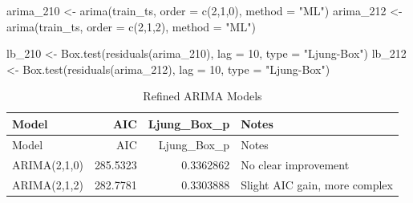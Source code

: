 \documentclass[
  11pt,
]{article}
\newenvironment{Shaded}{\begin{snugshade}}{\end{snugshade}}
\newcommand{\AttributeTok}[1]{\textcolor[rgb]{0.40,0.45,0.13}{#1}}
\newcommand{\DecValTok}[1]{\textcolor[rgb]{0.68,0.00,0.00}{#1}}
\newcommand{\FunctionTok}[1]{\textcolor[rgb]{0.28,0.35,0.67}{#1}}
\newcommand{\NormalTok}[1]{\textcolor[rgb]{0.00,0.23,0.31}{#1}}
\newcommand{\OtherTok}[1]{\textcolor[rgb]{0.00,0.23,0.31}{#1}}
\newcommand{\SpecialCharTok}[1]{\textcolor[rgb]{0.37,0.37,0.37}{#1}}
\newcommand{\StringTok}[1]{\textcolor[rgb]{0.13,0.47,0.30}{#1}}
\begin{document}
\begin{Shaded}
\begin{Highlighting}[]
\NormalTok{arima\_210 }\OtherTok{\textless{}{-}} \FunctionTok{arima}\NormalTok{(train\_ts, }\AttributeTok{order =} \FunctionTok{c}\NormalTok{(}\DecValTok{2}\NormalTok{,}\DecValTok{1}\NormalTok{,}\DecValTok{0}\NormalTok{), }\AttributeTok{method =} \StringTok{"ML"}\NormalTok{)}
\NormalTok{arima\_212 }\OtherTok{\textless{}{-}} \FunctionTok{arima}\NormalTok{(train\_ts, }\AttributeTok{order =} \FunctionTok{c}\NormalTok{(}\DecValTok{2}\NormalTok{,}\DecValTok{1}\NormalTok{,}\DecValTok{2}\NormalTok{), }\AttributeTok{method =} \StringTok{"ML"}\NormalTok{)}

\NormalTok{lb\_210 }\OtherTok{\textless{}{-}} \FunctionTok{Box.test}\NormalTok{(}\FunctionTok{residuals}\NormalTok{(arima\_210), }\AttributeTok{lag =} \DecValTok{10}\NormalTok{, }\AttributeTok{type =} \StringTok{"Ljung{-}Box"}\NormalTok{)}
\NormalTok{lb\_212 }\OtherTok{\textless{}{-}} \FunctionTok{Box.test}\NormalTok{(}\FunctionTok{residuals}\NormalTok{(arima\_212), }\AttributeTok{lag =} \DecValTok{10}\NormalTok{, }\AttributeTok{type =} \StringTok{"Ljung{-}Box"}\NormalTok{)}
\end{Highlighting}
\end{Shaded}

\begin{Shaded}
\end{Shaded}

\begin{longtable}[]{@{}lrrl@{}}
\caption{Refined ARIMA Models}\tabularnewline
\toprule\noalign{}
Model & AIC & Ljung\_Box\_p & Notes \\
\midrule\noalign{}
\endfirsthead
\toprule\noalign{}
Model & AIC & Ljung\_Box\_p & Notes \\
\midrule\noalign{}
\endhead
\bottomrule\noalign{}
\endlastfoot
ARIMA(2,1,0) & 285.5323 & 0.3362862 & No clear improvement \\
ARIMA(2,1,2) & 282.7781 & 0.3303888 & Slight AIC gain, more complex \\
\end{longtable}
\end{document}
